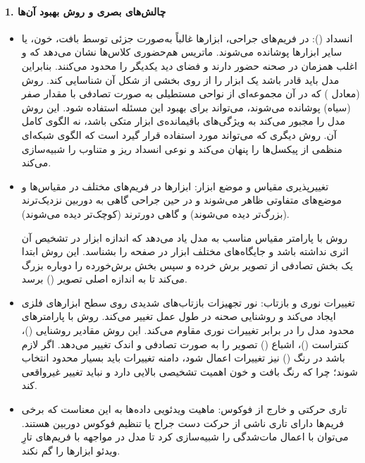 \documentclass{article}
\begin{document}
\paragraph{1. چالش‌های بصری و روش بهبود آن‌ها}\mbox{}
\begin{itemize}
\item انسداد ():
در فریم‌های جراحی، ابزارها غالباً به‌صورت جزئی توسط بافت، خون، یا سایر ابزارها پوشانده می‌شوند. ماتریس هم‌حضوری کلاس‌ها نشان می‌دهد که  و  اغلب همزمان در صحنه حضور دارند و فضای دید یکدیگر را محدود می‌کنند. بنابراین مدل باید قادر باشد یک ابزار را از روی بخشی از شکل آن شناسایی کند.
روش  (معادل ) که در آن مجموعه‌ای از نواحی مستطیلی به ‌صورت تصادفی با مقدار صفر (سیاه) پوشانده می‌شوند، می‌تواند برای بهبود این مسئله استفاده شود. این روش مدل را مجبور می‌کند به ویژگی‌های باقیمانده‌ی ابزار متکی باشد، نه الگوی کامل آن.
روش دیگری که می‌تواند مورد استفاده قرار گیرد  است که الگوی شبکه‌ای منظمی از پیکسل‌ها را پنهان می‌کند و نوعی انسداد ریز و متناوب را شبیه‌سازی می‌کند.

\item تغییرپذیری مقیاس و موضع ابزار:
ابزارها در فریم‌های مختلف در مقیاس‌ها و موضع‌های متفاوتی ظاهر می‌شوند و در حین جراحی گاهی به دوربین نزدیک‌ترند (بزرگ‌تر دیده می‌شوند) و گاهی دورترند (کوچک‌تر دیده می‌شوند).

روش  با پارامتر مقیاس مناسب به مدل یاد می‌دهد که اندازه ابزار در تشخیص آن اثری نداشته باشد و جایگاه‌های مختلف ابزار در صفحه را بشناسد. این روش ابتدا یک بخش تصادفی از تصویر برش خرده و سپس بخش برش‌خورده را دوباره بزرگ می‌کند تا به اندازه اصلی تصویر () برسد. 

\item تغییرات نوری و بازتاب:
نور تجهیزات بازتاب‌های شدیدی روی سطح ابزارهای فلزی ایجاد می‌کند و روشنایی صحنه در طول عمل تغییر می‌کند.
روش  با پارامترهای محدود مدل را در برابر تغییرات نوری مقاوم می‌کند.
این روش مقادیر روشنایی ()، کنتراست ()، اشباع () تصویر را به صورت تصادفی و اندک تغییر می‌دهد. اگر لازم باشد در رنگ  () نیز تغییرات اعمال شود، دامنه تغییرات باید بسیار محدود انتخاب شوند؛ چرا که رنگ بافت و خون اهمیت تشخیصی بالایی دارد و نباید تغییر غیرواقعی کند.

\item تاری حرکتی و خارج از فوکوس:
ماهیت ویدئویی داده‌ها به این معناست که برخی فریم‌ها دارای تاری ناشی از حرکت دست جراح یا تنظیم فوکوس دوربین هستند.
می‌توان با اعمال  مات‌شدگی را شبیه‌سازی کرد‌ تا مدل در مواجهه با فریم‌های تارِ ویدئو ابزارها را گم نکند.


\end{itemize}
\end{document}
